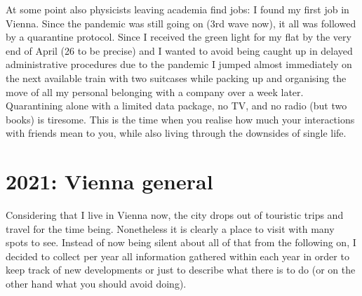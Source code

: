 At some point also physicists leaving academia find jobs: I found my first job in Vienna. Since the pandemic was still going on (3rd wave now), it all was followed by a quarantine protocol. Since I received the green light for my flat by the very end of April (26 to be precise) and I wanted to avoid being caught up in delayed administrative procedures due to the pandemic I jumped almost immediately on the next available train with two suitcases while packing up and organising the move of all my personal belonging with a company over a week later. Quarantining alone with a limited data package, no TV, and no radio (but two books) is tiresome. This is the time when you realise how much your interactions with friends mean to you, while also living through the downsides of single life.

\section{2021: Vienna general}
\label{2021Vienna}

Considering that I live in Vienna now, the city drops out of touristic trips and travel for the time being. Nonetheless it is clearly a place to visit with many spots to see. Instead of now being silent about all of that from the following on, I decided to collect per year all information gathered within each year in order to keep track of new developments or just to describe what there is to do (or on the other hand what you should avoid doing).\\

